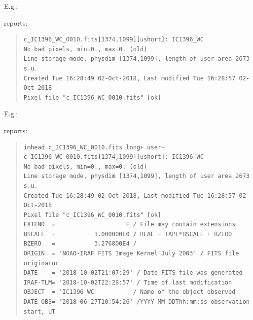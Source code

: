 E.g.:

\begin{quote}
{\color{verbcolor}{\verb#imhead c_IC1396_WC_0010.fits long+#}}
\end{quote}

reports:

{\color{darkgreen}
\begin{quote}
\begingroup \fontsize{8pt}{8pt}
\selectfont
\begin{verbatim}
c_IC1396_WC_0010.fits[1374,1099][ushort]: IC1396_WC
No bad pixels, min=0., max=0. (old)
Line storage mode, physdim [1374,1099], length of user area 2673 s.u.
Created Tue 16:28:49 02-Oct-2018, Last modified Tue 16:28:57 02-Oct-2018
Pixel file "c_IC1396_WC_0010.fits" [ok]
\end{verbatim}
\endgroup
\end{quote}
}
E.g.:

\begin{quote}
{\color{verbcolor}{\verb#imhead c_IC1396_WC_0010.fits long+ user+#}}
\end{quote}

reports:
{\color{darkgreen}
\begin{quote}
\begingroup \fontsize{8pt}{8pt}
\selectfont
\begin{verbatim}
imhead c_IC1396_WC_0010.fits long+ user+
c_IC1396_WC_0010.fits[1374,1099][ushort]: IC1396_WC
No bad pixels, min=0., max=0. (old)
Line storage mode, physdim [1374,1099], length of user area 2673 s.u.
Created Tue 16:28:49 02-Oct-2018, Last modified Tue 16:28:57 02-Oct-2018
Pixel file "c_IC1396_WC_0010.fits" [ok]
EXTEND  =                    F / File may contain extensions
BSCALE  =           1.000000E0 / REAL = TAPE*BSCALE + BZERO
BZERO   =           3.276800E4 /
ORIGIN  = 'NOAO-IRAF FITS Image Kernel July 2003' / FITS file originator
DATE    = '2018-10-02T21:07:29' / Date FITS file was generated
IRAF-TLM= '2018-10-02T22:28:57' / Time of last modification
OBJECT  = 'IC1396_WC'          / Name of the object observed
DATE-OBS= '2018-06-27T10:54:26' /YYYY-MM-DDThh:mm:ss observation start, UT
\end{verbatim}
\endgroup
\end{quote}
}
\clearpage
